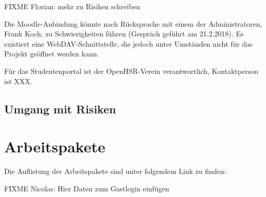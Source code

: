 \documentclass[a4paper]{article}
\let\oldsection\section
\renewcommand\section{\clearpage\oldsection}
\begin{document}
FIXME Florian: mehr zu Risiken schreiben

Die Moodle-Anbindung könnte nach Rücksprache mit einem der Administratoren, Frank Koch, zu Schwierigkeiten führen (Gespräch geführt am 21.2.2018). Es existiert eine WebDAV-Schnittstelle, die jedoch unter Umständen nicht für das Projekt geöffnet werden kann.

Für das Studentenportal ist der OpenHSR-Verein verantwortlich, Kontaktperson ist XXX.

\subsection{Umgang mit Risiken}

\section{Arbeitspakete}

Die Auflistung der Arbeitspakete sind unter folgendem Link zu finden:

FIXME Nicolas: Hier Daten zum Gastlogin einfügen

%
%
%
%
\end{document}
